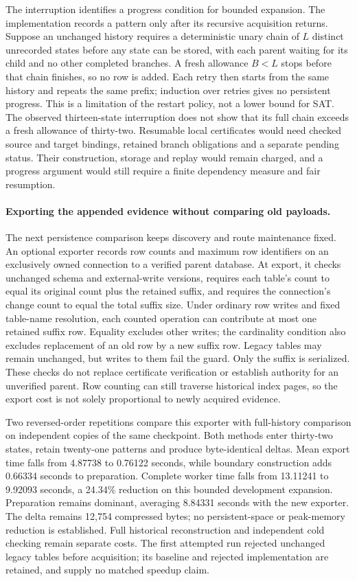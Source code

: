 \documentclass[11pt,a4paper]{article}
\numberwithin{equation}{section}
\theoremstyle{plain}
\theoremstyle{definition}
\theoremstyle{remark}
\begin{document}
The interruption identifies a progress condition for bounded expansion. The implementation records a pattern only after its recursive acquisition returns. Suppose an unchanged history requires a deterministic unary chain of $L$ distinct unrecorded states before any state can be stored, with each parent waiting for its child and no other completed branches. A fresh allowance $B<L$ stops before that chain finishes, so no row is added. Each retry then starts from the same history and repeats the same prefix; induction over retries gives no persistent progress. This is a limitation of the restart policy, not a lower bound for SAT. The observed thirteen-state interruption does not show that its full chain exceeds a fresh allowance of thirty-two. Resumable local certificates would need checked source and target bindings, retained branch obligations and a separate pending status. Their construction, storage and replay would remain charged, and a progress argument would still require a finite dependency measure and fair resumption.

\paragraph{Exporting the appended evidence without comparing old payloads.}
The next persistence comparison keeps discovery and route maintenance fixed. An optional exporter records row counts and maximum row identifiers on an exclusively owned connection to a verified parent database. At export, it checks unchanged schema and external-write versions, requires each table's count to equal its original count plus the retained suffix, and requires the connection's change count to equal the total suffix size. Under ordinary row writes and fixed table-name resolution, each counted operation can contribute at most one retained suffix row. Equality excludes other writes; the cardinality condition also excludes replacement of an old row by a new suffix row. Legacy tables may remain unchanged, but writes to them fail the guard. Only the suffix is serialized. These checks do not replace certificate verification or establish authority for an unverified parent. Row counting can still traverse historical index pages, so the export cost is not solely proportional to newly acquired evidence.

Two reversed-order repetitions compare this exporter with full-history comparison on independent copies of the same checkpoint. Both methods enter thirty-two states, retain twenty-one patterns and produce byte-identical deltas. Mean export time falls from 4.87738 to 0.76122 seconds, while boundary construction adds 0.66334 seconds to preparation. Complete worker time falls from 13.11241 to 9.92093 seconds, a 24.34\% reduction on this bounded development expansion. Preparation remains dominant, averaging 8.84331 seconds with the new exporter. The delta remains 12,754 compressed bytes; no persistent-space or peak-memory reduction is established. Full historical reconstruction and independent cold checking remain separate costs. The first attempted run rejected unchanged legacy tables before acquisition; its baseline and rejected implementation are retained, and supply no matched speedup claim.
\end{document}
